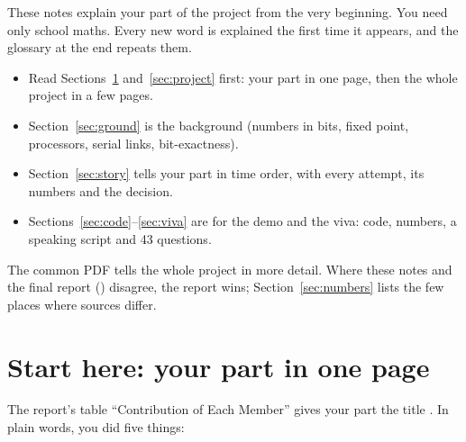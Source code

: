\documentclass[11pt]{article}
\begin{document}

\begin{simple}
These notes explain your part of the project from the very beginning. You need only school maths.
Every new word is explained the first time it appears, and the glossary at the end repeats them.
\begin{itemize}
  \item Read Sections~\ref{sec:start} and~\ref{sec:project} first: your part in one page, then the whole project in a few pages.
  \item Section~\ref{sec:ground} is the background (numbers in bits, fixed point, processors, serial links, bit-exactness).
  \item Section~\ref{sec:story} tells your part in time order, with every attempt, its numbers and the decision.
  \item Sections~\ref{sec:code}--\ref{sec:viva} are for the demo and the viva: code, numbers, a speaking script and 43 questions.
\end{itemize}
The common PDF  tells the whole project in more detail. Where these notes and the final report () disagree, the report wins; Section~\ref{sec:numbers} lists the few places where sources differ.
\end{simple}

\tableofcontents
\clearpage

\section{Start here: your part in one page}
\label{sec:start}

The report's table ``Contribution of Each Member'' gives your part the title . In plain words, you did five things:
\end{document}
